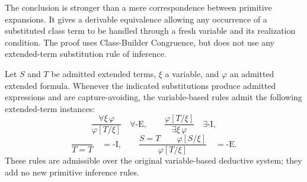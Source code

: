 The conclusion is stronger than a mere correspondence between
primitive expansions. It gives a derivable equivalence allowing
any occurrence of a substituted class term to be handled through
a fresh variable and its realization condition. The proof uses
Class-Builder Congruence, but does not use any extended-term
substitution rule of inference.


\begin{metatheorem}
\label{meta:extended-term-rules}
Let \(S\) and \(T\) be admitted extended terms, \(\xi\) a
variable, and \(\varphi\) an admitted extended formula. Whenever
the indicated substitutions produce admitted expressions and
are capture-avoiding, the variable-based rules admit the
following extended-term instances:
\[
\frac{\forall\xi\,\varphi}{\varphi[T/\xi]}
\quad\forall\text{-E},
\qquad
\frac{\varphi[T/\xi]}{\exists\xi\,\varphi}
\quad\exists\text{-I},
\]
\[
\frac{}{T=T}
\quad =\text{-I},
\qquad
\frac{S=T\qquad\varphi[S/\xi]}
{\varphi[T/\xi]}
\quad =\text{-E}.
\]
These rules are admissible over the original variable-based
deductive system; they add no new primitive inference rules.
\end{metatheorem}

